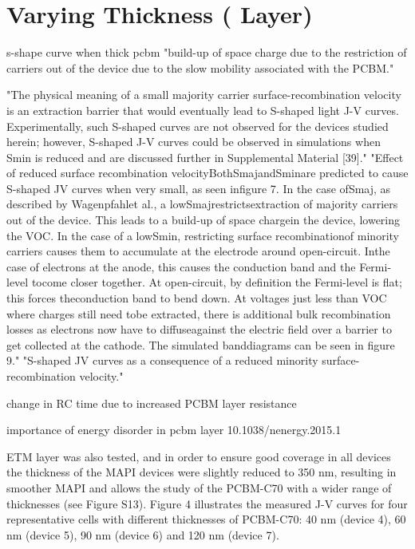 \section{Varying  Thickness ( Layer)}

s-shape curve when thick pcbm \cite{Wheeler2017} "build-up of space charge due to the restriction of carriers out of the device due to the slow mobility associated with the PCBM."


"The physical meaning of a small majority carrier surface-recombination velocity is an extraction barrier that would eventually lead to S-shaped light J-V curves. Experimentally, such S-shaped curves are not observed for the devices studied herein; however, S-shaped J-V curves could be observed in simulations when Smin is reduced and are discussed further in Supplemental Material [39]."
"Effect of reduced surface recombination velocityBothSmajandSminare predicted to cause S-shaped JV curves when very small, as seen infigure 7.  In the case ofSmaj,  as described by Wagenpfahlet al.,  a lowSmajrestrictsextraction of majority carriers out of the device.  This leads to a build-up of space chargein the device, lowering the VOC.  In the case of a lowSmin, restricting surface recombinationof  minority  carriers  causes  them  to  accumulate  at  the  electrode  around  open-circuit.   Inthe case of electrons at the anode, this causes the conduction band and the Fermi-level tocome closer together.  At open-circuit, by definition the Fermi-level is flat;  this forces theconduction band to bend down.  At voltages just less than VOC where charges still need tobe extracted, there is additional bulk recombination losses as electrons now have to diffuseagainst the electric field over a barrier to get collected at the cathode.  The simulated banddiagrams can be seen in figure 9."
"S-shaped JV curves as a consequence of a reduced minority surface-recombination velocity." \cite{Wheeler2015}

change in RC time due to increased PCBM layer resistance \cite{Wheeler2017}

importance of energy disorder in pcbm layer 10.1038/nenergy.2015.1





ETM layer was also tested, and in order to ensure good coverage in all devices the thickness of the MAPI devices were slightly reduced to 350 nm, resulting in smoother MAPI and allows the study of the PCBM-C70 with a wider range of thicknesses (see Figure S13). 
Figure 4 illustrates the measured J-V curves for four representative cells with different thicknesses of PCBM-C70: 40 nm (device 4), 60 nm (device 5), 90 nm (device 6) and 120 nm (device 7).


